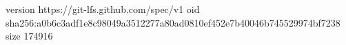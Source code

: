 version https://git-lfs.github.com/spec/v1
oid sha256:a0b6c3adf1e8c98049a3512277a80ad0810ef452e7b40046b745529974bf7238
size 174916
